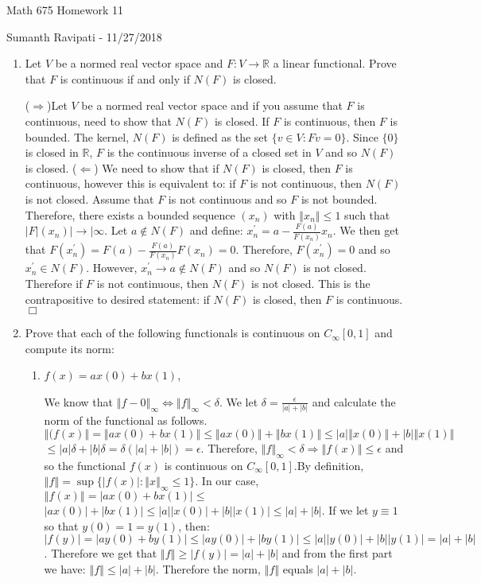 \documentclass[12pt,letterpaper,reqno]{amsart}
\newcommand{\R}{\mathbb R}
\newcommand{\norm}[1]{\left\vert #1 \right \vert}
\newcommand{\Norm}[1]{\left\Vert #1 \right \Vert}
\begin{document}
\thispagestyle{empty}
\centerline{\Large Math 675 Homework 11}
\centerline{Sumanth Ravipati - 11/27/2018}
\vspace{.15in}

\begin{enumerate}[1.]
\item Let $V$ be a normed real vector space and $F: V\rightarrow \R$ a linear functional. Prove that $F$ is continuous if and only if $N(F)$ is closed. %
\begin{flushleft}
($\Rightarrow$)Let $V$ be a normed real vector space and if you assume that $F$ is continuous, need to show that $N(F)$ is closed. If $F$ is continuous, then $F$ is bounded. The kernel, $N(F)$ is defined as the set $\{v \in V : Fv = 0\}$. Since $\{0\}$ is closed in $\R$, $F$ is the continuous inverse of a closed set in $V$ and so $N(F)$ is closed. ($\Leftarrow$) We need to show that if $N(F)$ is closed, then $F$ is continuous, however this is equivalent to: if $F$ is not continuous, then $N(F)$ is not closed. Assume that $F$ is not continuous and so $F$ is not bounded. Therefore, there exists a bounded sequence $(x_n)$ with $\Norm{x_n} \leq 1$ such that $\norm F(x_n) \norm \rightarrow \infty$. Let $a \not\in N(F)$ and define: $x_n^\prime = a - \frac{F(a)}{F(x_n)}x_n$. We then get that $F(x_n^\prime) = F(a) - \frac{F(a)}{F(x_n)}F(x_n) = 0$. Therefore, $F(x_n^\prime) = 0$ and so $x_n^\prime \in N(F)$. However, $x_n^\prime \rightarrow a \not\in N(F)$ and so $N(F)$ is not closed. Therefore if $F$ is not continuous, then $N(F)$ is not closed. This is the contrapositive to desired statement: if $N(F)$ is closed, then $F$ is continuous. $\Box$
\end{flushleft}
\item Prove that each of the following functionals is continuous on $C_\infty[0,1]$ and compute its norm:
\begin{enumerate}
\item $f(x)=ax(0)+bx(1)$,
\begin{flushleft}
We know that $\Norm{f - 0}_\infty \Leftrightarrow \Norm{f}_\infty < \delta$. We let $\delta = \frac{\epsilon}{|a|+|b|}$ and calculate the norm of the functional as follows. $\Norm{(f(x)} = \Norm{ax(0) + bx(1)} \leq \Norm{ax(0)} + \Norm{bx(1)} \leq |a|\Norm{x(0)} + |b|\Norm{x(1)}$ $\leq |a|\delta + |b|\delta = \delta(|a|+|b|) = \epsilon$. Therefore, $\Norm{f}_\infty < \delta \Rightarrow \Norm{f(x)} \leq \epsilon$ and so the functional $f(x)$ is continuous on $C_\infty[0,1]$.By definition, $\Norm{f} = \sup\{|f(x)| : \Norm{x}_\infty \leq 1\}$. In our case, $\Norm{f(x)} = |ax(0) + bx(1)| \leq$ $|ax(0)| + |bx(1)| \leq |a||x(0)| + |b||x(1)| \leq |a| + |b|$. If we let $y \equiv 1$ so that $y(0) = 1 = y(1)$, then: $|f(y)| = |ay(0) + by(1)| \leq |ay(0)| + |by(1)| \leq |a||y(0)| + |b||y(1)| = |a| + |b|$. Therefore we get that $\Norm{f} \geq |f(y)| = |a| + |b|$ and from the first part we have: $\Norm{f} \leq |a| + |b|$. Therefore the norm, $\Norm{f}$ equals  $|a| + |b|$.

\end{flushleft}
\end{enumerate}
\end{enumerate}
\end{document}
